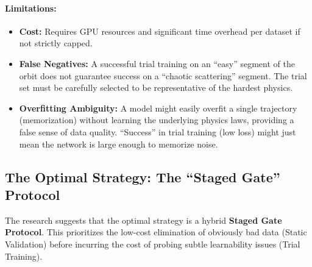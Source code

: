 \paragraph{Limitations:}
\begin{itemize}
    \item \textbf{Cost:} Requires GPU resources and significant time overhead per dataset if not strictly capped.
    \item \textbf{False Negatives:} A successful trial training on an ``easy'' segment of the orbit does not guarantee success on a ``chaotic scattering'' segment. The trial set must be carefully selected to be representative of the hardest physics.
    \item \textbf{Overfitting Ambiguity:} A model might easily overfit a single trajectory (memorization) without learning the underlying physics laws, providing a false sense of data quality. ``Success'' in trial training (low loss) might just mean the network is large enough to memorize noise.
\end{itemize}

\subsection{The Optimal Strategy: The ``Staged Gate'' Protocol}

The research suggests that the optimal strategy is a hybrid \textbf{Staged Gate Protocol}. This prioritizes the low-cost elimination of obviously bad data (Static Validation) before incurring the cost of probing subtle learnability issues (Trial Training).


